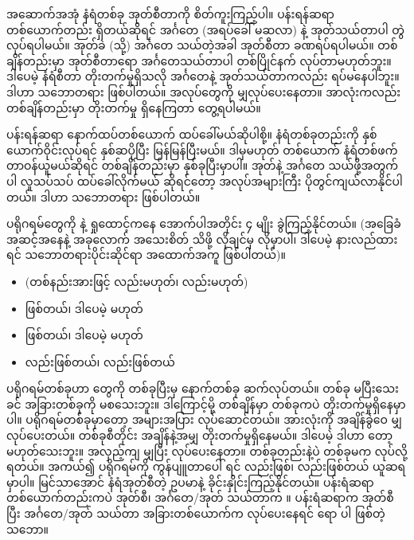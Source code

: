 အဆောက်အအုံ နံရံတစ်ခု အုတ်စီတာကို စိတ်ကူးကြည့်ပါ။ ပန်းရန်ဆရာ တစ်ယောက်တည်း ရှိတယ်ဆိုရင် အင်္ဂတေ (အရပ်ခေါ် မဆလာ) နဲ့ အုတ်သယ်တာပါ တွဲလုပ်ရပါမယ်။ အုတ်ခဲ (သို့) အင်္ဂတေ သယ်တဲ့အခါ အုတ်စီတာ ခဏရပ်ရပါမယ်။ တစ်ချိန်တည်းမှာ အုတ်စီတာရော အင်္ဂတေသယ်တာပါ တစ်ပြိုင်နက် လုပ်တာမဟုတ်ဘူး။ ဒါပေမဲ့ နံရံစီတာ တိုးတက်မှုရှိသလို အင်္ဂတေနဲ့ အုတ်သယ်တာကလည်း ရပ်မနေပါဘူး။ ဒါဟာ  သဘောတရား ဖြစ်ပါတယ်။ အလုပ်တွေကို မျှလုပ်ပေးနေတာ။ အာလုံးကလည်း တစ်ချိန်တည်းမှာ တိုးတက်မှု ရှိနေကြတာ တွေ့ရပါမယ်။

ပန်းရန်ဆရာ နောက်ထပ်တစ်ယောက် ထပ်ခေါ်မယ်ဆိုပါစို့။ နံရံတစ်ခုတည်းကို နှစ်ယောက်ဝိုင်းလုပ်ရင် နှစ်ဆပိုပြီး မြန်မြန်ပြီးမယ်။ ဒါမှမဟုတ် တစ်ယောက် နံရံတစ်ဖက် တာဝန်ယူမယ်ဆိုရင် တစ်ချိန်တည်းမှာ နှစ်ခုပြီးမှာပါ။ အုတ်နဲ့ အင်္ဂတေ သယ်ဖို့အတွက်ပါ လူသပ်သပ် ထပ်ခေါ်လိုက်မယ် ဆိုရင်တော့ အလုပ်အများကြီး ပိုတွင်ကျယ်လာနိုင်ပါတယ်။ ဒါဟာ  သဘောတရား ဖြစ်ပါတယ်။ 

ပရိုဂရမ်တွေကို  နဲ့  ရှုထောင့်ကနေ အောက်ပါအတိုင်း ၄ မျိုး ခွဲကြည့်နိုင်တယ်။ (အခြေခံ အဆင့်အနေနဲ့ အခုလောက် အသေးစိတ် သိဖို့ လိုချင်မှ လိုမှာပါ၊ ဒါပေမဲ့ နားလည်ထားရင် သဘောတရားပိုင်းဆိုင်ရာ အထောက်အကူ ဖြစ်ပါတယ်)။
%
\begin{itemize}
    \item {} (တစ်နည်းအားဖြင့်  လည်းမဟုတ်၊  လည်းမဟုတ်) 
    \item {} ဖြစ်တယ်၊ ဒါပေမဲ့  မဟုတ်
    \item {} ဖြစ်တယ်၊ ဒါပေမဲ့  မဟုတ်
    \item {} လည်းဖြစ်တယ်၊  လည်းဖြစ်တယ်
\end{itemize}
%


 ပရိုဂရမ်တစ်ခုဟာ  တွေကို တစ်ခုပြီးမှ နောက်တစ်ခု ဆက်လုပ်တယ်။ တစ်ခု မပြီးသေးခင် အခြားတစ်ခုကို မစသေးဘူး။ ဒါကြောင့်မို့ တစ်ချိန်မှာ  တစ်ခုကပဲ တိုးတက်မှုရှိနေမှာပါ။  ပရိုဂရမ်တစ်ခုမှာတော့   အများအပြား လုပ်ဆောင်တယ်။ အားလုံးကို အချိန်ခွဲဝေ မျှလုပ်ပေးတယ်။  တစ်ခုစီတိုင်း အချိန်နဲ့အမျှ တိုးတက်မှုရှိနေမယ်။ ဒါပေမဲ့ ဒါဟာ  တော့ မဟုတ်သေးဘူး။ အလှည့်ကျ မျှပြီး လုပ်ပေးနေတာ။  တစ်ခုတည်းနဲ့ပဲ  တစ်ခုမက  လုပ်လို့ရတယ်။ အကယ်၍  ပရိုဂရမ်ကို  ကွန်ပျူတာပေါ်  ရင်  လည်းဖြစ်၊  လည်းဖြစ်တယ် ယူဆရမှာပါ။ မြင်သာအောင် နံရံအုတ်စီတဲ့ ဥပမာနဲ့ ခိုင်းနှိုင်းကြည့်နိုင်တယ်။ ပန်းရံဆရာ တစ်ယောက်တည်းကပဲ အုတ်စီ၊ အင်္ဂတေ/အုတ် သယ်တာက ။ ပန်းရံဆရာက အုတ်စီပြီး အင်္ဂတေ/အုတ် သယ်တာ အခြားတစ်ယောက်က လုပ်ပေးနေရင်  ရော  ပါ ဖြစ်တဲ့သဘော။

